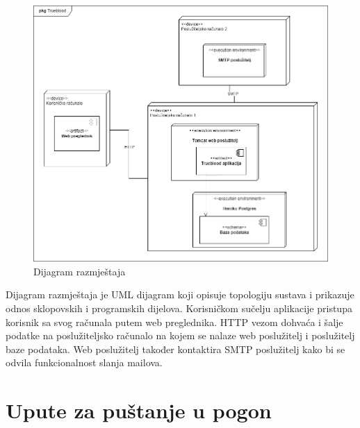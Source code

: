 			 \begin{figure}[H]             
    	        \includegraphics[scale=0.50]{slike/DR1_1.png}
            	\centering
            	\caption{Dijagram razmještaja}
            	\label{fig:dr}
            \end{figure}
            
            \par
            Dijagram razmještaja je UML dijagram koji opisuje topologiju sustava i prikazuje odnos sklopovskih i programskih dijelova. Korisničkom sučelju aplikacije pristupa korisnik sa svog računala putem web preglednika. HTTP vezom dohvaća i šalje podatke na poslužiteljsko računalo na kojem se nalaze web poslužitelj i poslužitelj baze podataka. Web poslužitelj također kontaktira SMTP poslužitelj kako bi se odvila funkcionalnost slanja mailova.
            
			
			\eject 
		
		\section{Upute za puštanje u pogon}
		
		
			
